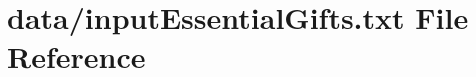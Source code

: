 \hypertarget{inputEssentialGifts_8txt}{}\section{data/input\+Essential\+Gifts.txt File Reference}
\label{inputEssentialGifts_8txt}
